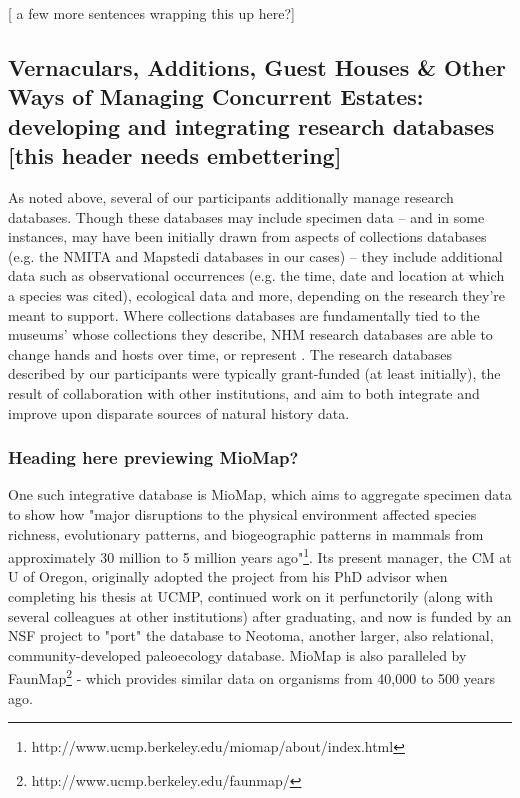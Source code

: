 [ a few more sentences wrapping this up here?]

\subsection{Vernaculars, Additions, Guest Houses \& Other Ways of Managing Concurrent Estates: developing and integrating research databases [this header needs embettering]} 

As noted above, several of our participants additionally manage research databases. Though these databases may include specimen data -- and in some instances, may have been initially drawn from aspects of collections databases (e.g. the NMITA and Mapstedi databases in our cases) -- they include additional data such as observational occurrences (e.g. the time, date and location at which a species was cited), ecological data and more, depending on the research they're meant to support. Where collections databases are fundamentally tied to the museums' whose collections they describe, NHM research databases are able to change hands and hosts over time, or represent . The research databases described by our participants were typically grant-funded (at least initially), the result of collaboration with other institutions, and aim to both integrate and improve upon disparate sources of natural history data. 

\subsubsection{Heading here previewing MioMap?}

One such integrative database is MioMap, which aims to aggregate specimen data to show how "major disruptions to the physical environment affected species richness, evolutionary patterns, and biogeographic patterns in mammals from approximately 30 million to 5 million years ago"\footnote{http://www.ucmp.berkeley.edu/miomap/about/index.html}. Its present manager, the CM at U of Oregon, originally adopted the project from his PhD advisor when completing his thesis at UCMP, continued work on it perfunctorily (along with several colleagues at other institutions) after graduating, and now is funded by an NSF project to "port" the database to Neotoma, another larger, also relational, community-developed paleoecology database. MioMap is also paralleled by FaunMap\footnote{http://www.ucmp.berkeley.edu/faunmap/} - which provides similar data on organisms from 40,000 to 500 years ago.

